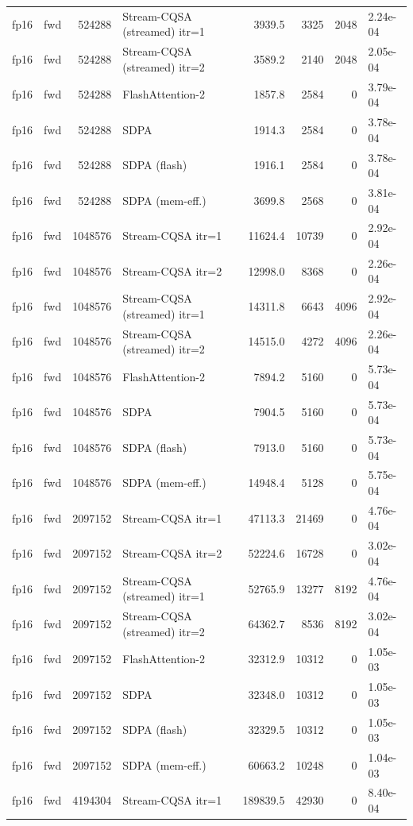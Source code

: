 \begin{tabular}{llrlrrrl}
fp16 & fwd & 524288 & Stream-CQSA (streamed) itr=1 & 3939.5 & 3325 & 2048 & 2.24e-04 \\
fp16 & fwd & 524288 & Stream-CQSA (streamed) itr=2 & 3589.2 & 2140 & 2048 & 2.05e-04 \\
fp16 & fwd & 524288 & FlashAttention-2 & 1857.8 & 2584 & 0 & 3.79e-04 \\
fp16 & fwd & 524288 & SDPA & 1914.3 & 2584 & 0 & 3.78e-04 \\
fp16 & fwd & 524288 & SDPA (flash) & 1916.1 & 2584 & 0 & 3.78e-04 \\
fp16 & fwd & 524288 & SDPA (mem-eff.) & 3699.8 & 2568 & 0 & 3.81e-04 \\
fp16 & fwd & 1048576 & Stream-CQSA itr=1 & 11624.4 & 10739 & 0 & 2.92e-04 \\
fp16 & fwd & 1048576 & Stream-CQSA itr=2 & 12998.0 & 8368 & 0 & 2.26e-04 \\
fp16 & fwd & 1048576 & Stream-CQSA (streamed) itr=1 & 14311.8 & 6643 & 4096 & 2.92e-04 \\
fp16 & fwd & 1048576 & Stream-CQSA (streamed) itr=2 & 14515.0 & 4272 & 4096 & 2.26e-04 \\
fp16 & fwd & 1048576 & FlashAttention-2 & 7894.2 & 5160 & 0 & 5.73e-04 \\
fp16 & fwd & 1048576 & SDPA & 7904.5 & 5160 & 0 & 5.73e-04 \\
fp16 & fwd & 1048576 & SDPA (flash) & 7913.0 & 5160 & 0 & 5.73e-04 \\
fp16 & fwd & 1048576 & SDPA (mem-eff.) & 14948.4 & 5128 & 0 & 5.75e-04 \\
fp16 & fwd & 2097152 & Stream-CQSA itr=1 & 47113.3 & 21469 & 0 & 4.76e-04 \\
fp16 & fwd & 2097152 & Stream-CQSA itr=2 & 52224.6 & 16728 & 0 & 3.02e-04 \\
fp16 & fwd & 2097152 & Stream-CQSA (streamed) itr=1 & 52765.9 & 13277 & 8192 & 4.76e-04 \\
fp16 & fwd & 2097152 & Stream-CQSA (streamed) itr=2 & 64362.7 & 8536 & 8192 & 3.02e-04 \\
fp16 & fwd & 2097152 & FlashAttention-2 & 32312.9 & 10312 & 0 & 1.05e-03 \\
fp16 & fwd & 2097152 & SDPA & 32348.0 & 10312 & 0 & 1.05e-03 \\
fp16 & fwd & 2097152 & SDPA (flash) & 32329.5 & 10312 & 0 & 1.05e-03 \\
fp16 & fwd & 2097152 & SDPA (mem-eff.) & 60663.2 & 10248 & 0 & 1.04e-03 \\
fp16 & fwd & 4194304 & Stream-CQSA itr=1 & 189839.5 & 42930 & 0 & 8.40e-04 \\

\end{tabular}
